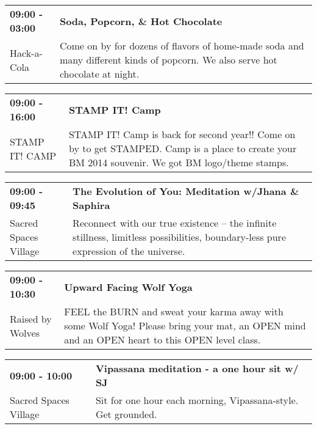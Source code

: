 \begin{tabular}{ p{1in} p{2.2in} }
    \textbf{09:00 - 03:00} & \textbf{Soda, Popcorn, \& Hot Chocolate} \\
    Hack-a-Cola \newline  & Come on by for dozens of flavors of home-made soda and many different kinds of popcorn. We also serve hot chocolate at night. \\
    \hline 
\end{tabular}
    
\begin{tabular}{ p{1in} p{2.2in} }
    \textbf{09:00 - 16:00} & \textbf{STAMP IT! Camp} \\
    STAMP IT! CAMP \newline  & STAMP IT! Camp is back for second year!! Come on by to get STAMPED. Camp is a place to create your BM 2014 souvenir. We got BM logo/theme stamps. \\
    \hline 
\end{tabular}
    
\begin{tabular}{ p{1in} p{2.2in} }
    \textbf{09:00 - 09:45} & \textbf{The Evolution of You: Meditation w/Jhana \& Saphira} \\
    Sacred Spaces Village \newline  & Reconnect with our true existence -- the infinite stillness, limitless possibilities, boundary-less pure expression of the universe. \\
    \hline 
\end{tabular}
    
\begin{tabular}{ p{1in} p{2.2in} }
    \textbf{09:00 - 10:30} & \textbf{Upward Facing Wolf Yoga} \\
    Raised by Wolves \newline  & FEEL the BURN and sweat your karma away with some Wolf Yoga! Please bring your mat, an OPEN mind and an OPEN heart to this OPEN level class. \\
    \hline 
\end{tabular}
    
\begin{tabular}{ p{1in} p{2.2in} }
    \textbf{09:00 - 10:00} & \textbf{Vipassana meditation - a one hour sit w/ SJ} \\
    Sacred Spaces Village \newline  & Sit for one hour each morning, Vipassana-style. Get grounded. \\
    \hline 
\end{tabular}
    
